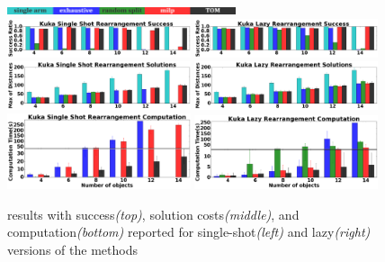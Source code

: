 \begin{figure}[h!]
	\centering
	\includegraphics[width=0.6\textwidth]{figures/results/labels}
	\includegraphics[width=0.48\textwidth]{figures/results/2_kuka_ms_success}
	\includegraphics[width=0.48\textwidth]{figures/results/1_kuka_lazy_ms_success}
	\includegraphics[width=0.48\textwidth]{figures/results/2_kuka_ms_cost}
	\includegraphics[width=0.48\textwidth]{figures/results/1_kuka_lazy_ms_cost}
	\includegraphics[width=0.48\textwidth]{figures/results/2_kuka_ms_time}
	\includegraphics[width=0.48\textwidth]{figures/results/1_kuka_lazy_ms_time}
    \caption{\textit{\kuka}results with success\textit{(top)}, solution costs\textit{(middle)}, and computation\textit{(bottom)} reported for single-shot\textit{(left)} and lazy\textit{(right)} versions of the methods}
	\label{fig:kuka}
\end{figure}

